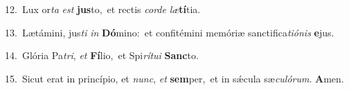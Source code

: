 {\numbfont\textcolor{\numbcolor}{12.}}~Lux or\textit{ta} \textit{est} \textbf{jus}\-to,~\star et rectis \textit{cor}\-\textit{de} \textit{læ}\-\textbf{tí}tia.\par
{\numbfont\textcolor{\numbcolor}{13.}}~Lætámini, jus\textit{ti} \textit{in} \textbf{Dó}\-mino:~\star et confitémini memóriæ sanctifica\-\textit{ti}\-\textit{ó}\textit{nis} \textbf{e}\-jus.\par
{\numbfont\textcolor{\numbcolor}{14.}}~Glória Pa\-\textit{tri}\-, \textit{et} \textbf{Fí}\-lio,~\star et Spi\-\textit{rí}\-\textit{tu}\textit{i} \textbf{Sanc}\-to.\par
{\numbfont\textcolor{\numbcolor}{15.}}~Sicut erat in princípio, et \textit{nunc}\-, \textit{et} \textbf{sem}\-per,~\star et in sǽcula sæ\-\textit{cu}\-\textit{ló}\textit{rum}. \textbf{A}\-men.\par
